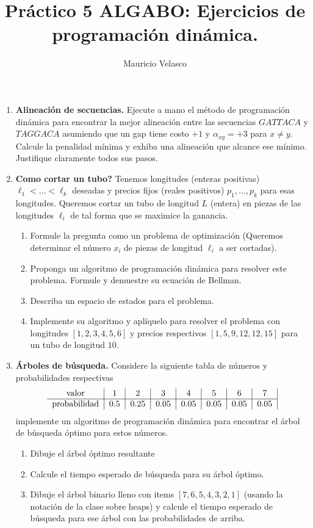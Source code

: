 \documentclass[12pt, a4paper]{article}
\date{}
\begin{document}
\title{Pr\'actico 5 ALGABO: Ejercicios de programaci\'on dinámica.}
\author{Mauricio Velasco}
\maketitle{}
\begin{enumerate} 
\item {\bf Alineación de secuencias.} Ejecute a mano el método de programación dinámica para encontrar la mejor alineación entre las secuencias $GATTACA$ y $TAGGACA$ asumiendo que un gap tiene costo $+1$ y $\alpha_{xy}=+3$ para $x\neq y$. Calcule la penalidad mínima y exhiba una alineación que alcance ese mínimo. Justifique claramente todos sus pasos.

\item {\bf Como cortar un tubo?} Tenemos longitudes (enteras positivas) $\ell_1<\dots< \ell_k$ deseadas y precios fijos (reales positivos) $p_1,\dots, p_k$ para esas longitudes. Queremos cortar un tubo de longitud $L$ (entera) en piezas de las longitudes $\ell_i$ de tal forma que se maximice la ganancia.  
\begin{enumerate}
\item Formule la pregunta como un problema de optimización (Queremos determinar el número $x_i$ de piezas de longitud $\ell_i$ a ser cortadas). 
\item Proponga un algoritmo de programación dinámica para resolver este problema. Formule y demuestre su ecuación de Bellman.
\item Describa un espacio de estados para el problema.
\item Implemente su algoritmo y aplíquelo para resolver el problema con longitudes $[1,2,3,4,5,6]$ y precios respectivos $[1, 5, 9, 12, 12, 15]$ para un tubo de longitud $10$.
\end{enumerate}



\item {\bf Árboles de búsqueda.} Considere la siguiente tabla de números y probabilidades respectivas
\[
\begin{tabular}{c|c|c|c|c|c|c|c|c}
\text{valor} & 1 & 2 & 3 & 4 & 5 & 6 & 7\\
\hline
\text{probabilidad} & 0.5 & 0.25 & 0.05 & 0.05 & 0.05 & 0.05 & 0.05 \\ 
\end{tabular}
\]
implemente un algoritmo de programación dinámica para encontrar el árbol de búsqueda óptimo para estos números.
\begin{enumerate}
\item Dibuje el árbol \'optimo resultante
\item Calcule el tiempo esperado de búsqueda para su árbol óptimo.
\item Dibuje el árbol binario lleno con items $[7,6,5,4,3,2,1]$ (usando la notación de la clase sobre heaps) y calcule el tiempo esperado de búsqueda para ese árbol con las probabilidades de arriba.
\end{enumerate}


\end{enumerate}
\end{document}
